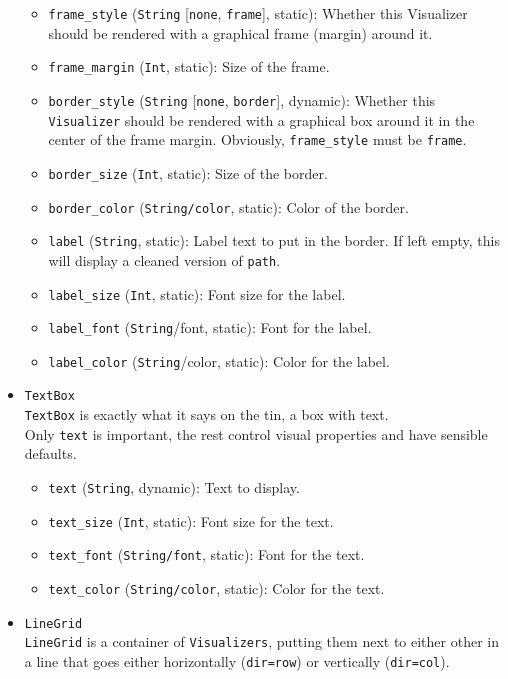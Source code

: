 \documentclass[11pt]{article}
\begin{document}
\begin{itemize}
\begin{itemize}
    \item \texttt{frame\_style} (\texttt{String} [\texttt{none}, \texttt{frame}], static): Whether this Visualizer should be rendered with a graphical frame (margin) around it.
    \item \texttt{frame\_margin} (\texttt{Int}, static): Size of the frame.
    \item \texttt{border\_style} (\texttt{String} [\texttt{none}, \texttt{border}], dynamic): Whether this \texttt{Visualizer} should be rendered with a graphical box around it in the center of the frame margin. Obviously, \texttt{frame\_style} must be \texttt{frame}.
    \item \texttt{border\_size} (\texttt{Int}, static): Size of the border.
    \item \texttt{border\_color} (\texttt{String/color}, static): Color of the border.
    \item \texttt{label} (\texttt{String}, static): Label text to put in the border. If left empty, this will display a cleaned version of \texttt{path}.
    \item \texttt{label\_size} (\texttt{Int}, static): Font size for the label.
    \item \texttt{label\_font} (\texttt{String}/font, static): Font for the label.
    \item \texttt{label\_color} (\texttt{String}/color, static): Color for the label.
  \end{itemize}
  \item \texttt{TextBox} \\
  \texttt{TextBox} is exactly what it says on the tin, a box with text. \\
  Only \texttt{text} is important, the rest control visual properties and have sensible defaults.
  \begin{itemize}
    \item \texttt{text} (\texttt{String}, dynamic): Text to display.
    \item \texttt{text\_size} (\texttt{Int}, static): Font size for the text.
    \item \texttt{text\_font} (\texttt{String/font}, static): Font for the text.
    \item \texttt{text\_color} (\texttt{String/color}, static): Color for the text.
  \end{itemize}
  \item \texttt{LineGrid} \\
  \texttt{LineGrid} is a container of \texttt{Visualizers}, putting them next to either other in a line that goes either horizontally (\texttt{dir=row}) or vertically (\texttt{dir=col}). \\

\end{itemize}
\end{document}
